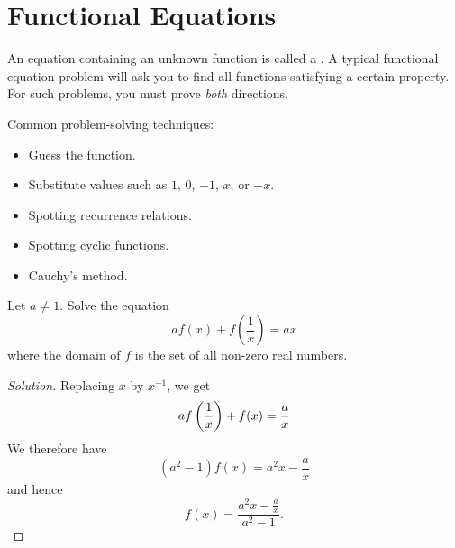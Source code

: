 \chapter{Functional Equations}
An equation containing an unknown function is called a . A typical functional equation problem will ask you to find all functions satisfying a certain property. For such problems, you must prove \emph{both} directions.

Common problem-solving techniques:
\begin{itemize}
\item Guess the function.
\item Substitute values such as $1$, $0$, $-1$, $x$, or $-x$.
\item Spotting recurrence relations.
\item Spotting cyclic functions.
\item Cauchy's method.
\end{itemize}

\begin{exmp}{}{} 
Let $a \neq 1$. Solve the equation 
\[ a f(x) + f\left(\frac{1}{x}\right) = ax \] 
where the domain of $f$ is the set of all non-zero real numbers. 
\end{exmp} 

\begin{proof}[Solution]
Replacing $x$ by $x^{-1}$, we get \[ a f\left(\frac{1}{x}\right) + f(x) = \frac{a}{x} \] We therefore have \[ (a^2-1)f(x) = a^2 x-\frac{a}{x} \] and hence \[ \boxed{f(x) = \frac{a^2 x-\frac{a}{x}}{a^2-1}}. \]
\end{proof}

